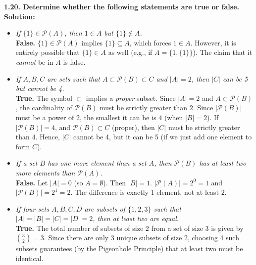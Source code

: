 \documentclass[12pt]{article}
\begin{document}
\vspace{0.5cm}
\textbf{1.20. Determine whether the following statements are true or false.} \\
\textbf{Solution:}
\begin{itemize}
    \item[(a)] \textit{If $\{1\} \in \mathcal{P}(A)$, then $1 \in A$ but $\{1\} \notin A$.} \\
    \textbf{False.} $\{1\} \in \mathcal{P}(A)$ implies $\{1\} \subseteq A$, which forces $1 \in A$. However, it is entirely possible that $\{1\} \in A$ as well (e.g., if $A = \{1, \{1\}\}$). The claim that it \textit{cannot} be in $A$ is false.
    \item[(b)] \textit{If $A, B, C$ are sets such that $A \subset \mathcal{P}(B) \subset C$ and $|A|=2$, then $|C|$ can be 5 but cannot be 4.} \\
    \textbf{True.} The symbol $\subset$ implies a \textit{proper} subset. Since $|A|=2$ and $A \subset \mathcal{P}(B)$, the cardinality of $\mathcal{P}(B)$ must be strictly greater than $2$. Since $|\mathcal{P}(B)|$ must be a power of $2$, the smallest it can be is $4$ (when $|B|=2$). If $|\mathcal{P}(B)| = 4$, and $\mathcal{P}(B) \subset C$ (proper), then $|C|$ must be strictly greater than $4$. Hence, $|C|$ cannot be 4, but it can be 5 (if we just add one element to form $C$).
    \item[(c)] \textit{If a set $B$ has one more element than a set $A$, then $\mathcal{P}(B)$ has at least two more elements than $\mathcal{P}(A)$.} \\
    \textbf{False.} Let $|A| = 0$ (so $A = \emptyset$). Then $|B| = 1$. $|\mathcal{P}(A)| = 2^0 = 1$ and $|\mathcal{P}(B)| = 2^1 = 2$. The difference is exactly $1$ element, not at least $2$.
    \item[(d)] \textit{If four sets $A, B, C, D$ are subsets of $\{1, 2, 3\}$ such that $|A|=|B|=|C|=|D|=2$, then at least two are equal.} \\
    \textbf{True.} The total number of subsets of size $2$ from a set of size $3$ is given by $\binom{3}{2} = 3$. Since there are only $3$ unique subsets of size $2$, choosing $4$ such subsets guarantees (by the Pigeonhole Principle) that at least two must be identical.
\end{itemize}
\end{document}
